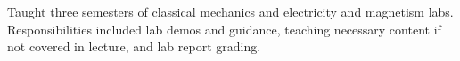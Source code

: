 \documentclass[10pt]{res}
\begin{document}
\begin{resume}
    Taught three semesters of classical mechanics and electricity and magnetism labs. Responsibilities included lab demos and guidance, teaching necessary content if not covered in lecture, and lab report grading.
%   



\end{resume}
\end{document}
